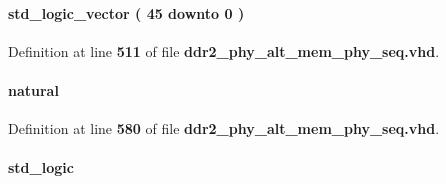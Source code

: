 \paragraph[{wdata}]{ {\bfseries \textcolor{comment}{std\+\_\+logic\+\_\+vector}\textcolor{vhdlchar}{ }\textcolor{vhdlchar}{(}\textcolor{vhdlchar}{ }\textcolor{vhdlchar}{ } \textcolor{vhdldigit}{45} \textcolor{vhdlchar}{ }\textcolor{keywordflow}{downto}\textcolor{vhdlchar}{ }\textcolor{vhdlchar}{ } \textcolor{vhdldigit}{0} \textcolor{vhdlchar}{ }\textcolor{vhdlchar}{)}\textcolor{vhdlchar}{ }} \hspace{0.3cm}{\ttfamily [Record]}}\label{classddr2__phy__alt__mem__phy__record__pkg_a7d79444104778d0dd7225ab62a1147e5}


Definition at line {\bf 511} of file {\bf ddr2\+\_\+phy\+\_\+alt\+\_\+mem\+\_\+phy\+\_\+seq.\+vhd}.

\paragraph[{wlat}]{ {\bfseries \textcolor{comment}{natural}\textcolor{vhdlchar}{ }} \hspace{0.3cm}{\ttfamily [Record]}}\label{classddr2__phy__alt__mem__phy__record__pkg_a3163575c697dd378dfb9630b938daed4}


Definition at line {\bf 580} of file {\bf ddr2\+\_\+phy\+\_\+alt\+\_\+mem\+\_\+phy\+\_\+seq.\+vhd}.

\paragraph[{write}]{ {\bfseries \textcolor{comment}{std\+\_\+logic}\textcolor{vhdlchar}{ }} \hspace{0.3cm}{\ttfamily [Record]}}\label{classddr2__phy__alt__mem__phy__record__pkg_a439da1bac8a3a29cc8c02d11f50282e5}


